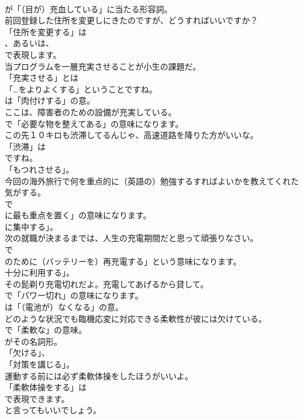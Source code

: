 \documentclass[8pt]{extreport}
\begin{document}
\begin{CJK}{UTF8}{min}
\\	が「（目が）充血している」に当たる形容詞。	
\\	前回登録した住所を変更しにきたのですが、どうすればいいですか？ 
\\	「住所を変更する」は 
\\	、あるいは、
\\	で表現します。	
\\	当プログラムを一層充実させることが小生の課題だ。 
\\	「充実させる」とは
\\	「…をよりよくする」ということですね。
\\	は「肉付けする」の意。	
\\	ここは、障害者のための設備が充実している。 
\\	で「必要な物を整えてある」の意味になります。	
\\	この先１０キロも渋滞してるんじゃ、高速道路を降りた方がいいな。 
\\	「渋滞」は
\\	ですね。
\\	「もつれさせる」。	
\\	今回の海外旅行で何を重点的に（英語の）勉強するすればよいかを教えてくれた気がする。 
\\	で
\\	に最も重点を置く」の意味になります。
\\	に集中する」。	
\\	次の就職が決まるまでは、人生の充電期間だと思って頑張りなさい。 
\\	で
\\	のために（バッテリーを）再充電する」という意味になります。
\\	十分に利用する」。	
\\	その髭剃り充電切れだよ。充電してあげるから貸して。 
\\	で「パワー切れ」の意味になります。
\\	は「（電池が）なくなる」の意。	
\\	どのような状況でも臨機応変に対応できる柔軟性が彼には欠けている。 
\\	で「柔軟な」の意味。
\\	がその名詞形。
\\	「欠ける」、
\\	「対策を講じる」。	
\\	運動する前には必ず柔軟体操をしたほうがいいよ。 
\\	「柔軟体操をする」は 
\\	で表現できます。
\\	と言ってもいいでしょう。	

\end{CJK}
\end{document}
